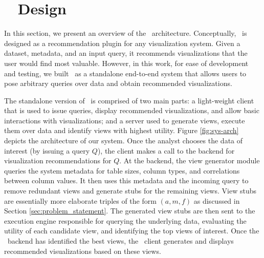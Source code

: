 

\section{{\large \SeeDB\ } Design}
\label{sec:system_architecture}

In this section, we present an overview of the \SeeDB\ architecture.
Conceptually, \SeeDB\ is designed as a recommendation plugin for any 
visualization system. Given a dataset, metadata, and an input query, 
it recommends visualizations that the user would find most valuable.
However, in this work, for ease of development and testing, we built 
\SeeDB\ as a standalone end-to-end system that allows users to pose 
arbitrary queries over data and obtain recommended visualizations.

The standalone version of \SeeDB\ is comprised of two main parts: 
a light-weight client that is 
used to issue queries, display recommended visualizations, and allow basic 
interactions with visualizations; and a server used to generate views, execute
them over data and identify views with highest utility. 
Figure \ref{fig:sys-arch} depicts the architecture of our system.
Once the analyst chooses the data of interest (by issuing a query $Q$), the
client makes a call to the backend for visualization recommendations for $Q$.
At the backend, the view generator module queries the system metadata for table sizes, 
column types, and correlations between column values. 
It then uses this metadata and the incoming query to remove redundant views and generate stubs for the remaining views. 
View stubs are essentially more elaborate triples of the form $(a, m, f)$ as
discussed in Section \ref{sec:problem_statement}. 
The generated view stubs are then sent to the execution engine
responsible for querying the underlying data, evaluating the utility of each
candidate view, and identifying the top views of interest. 
Once the \SeeDB\ backend has identified the best views, the \SeeDB\
client generates and displays recommended visualizations based on these views. 

